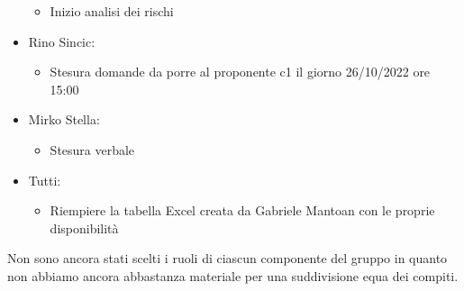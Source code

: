 \begin{itemize}
    \begin{itemize}
        \item Inizio analisi dei rischi
    \end{itemize}
    \item Rino Sincic:
    \begin{itemize}
        \item Stesura domande da porre al proponente c1 il giorno 26/10/2022 ore 15:00
    \end{itemize}
    \item Mirko Stella:
    \begin{itemize}
        \item Stesura verbale
    \end{itemize}
    \item Tutti: 
    \begin{itemize}
        \item Riempiere la tabella Excel creata da Gabriele Mantoan con le proprie disponibilità
    \end{itemize}
\end{itemize}
Non sono ancora stati scelti i ruoli di ciascun componente del gruppo in quanto non abbiamo ancora abbastanza materiale per
una suddivisione equa dei compiti.